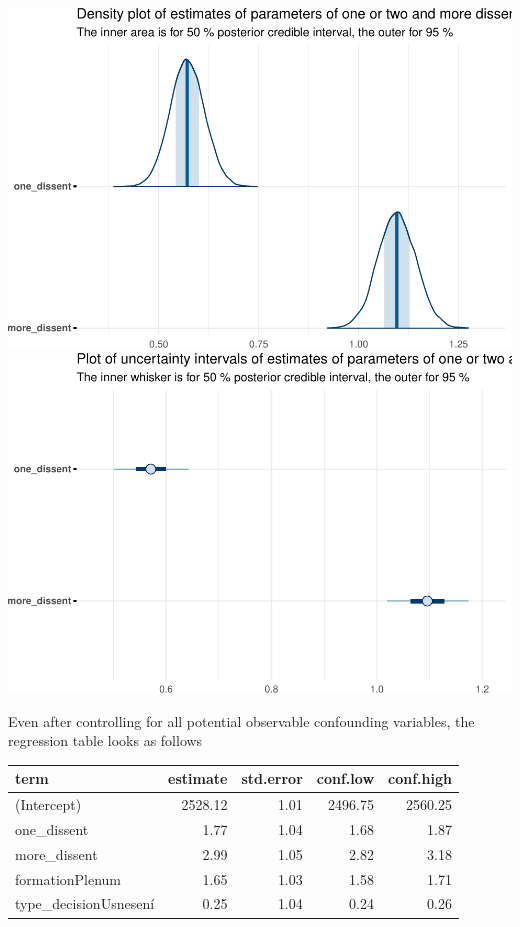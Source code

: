 \documentclass[
  11pt,
]{article}
\begin{document}
\includegraphics{dissents_article_files/figure-latex/length_parameter_plots-1.pdf}
\includegraphics{dissents_article_files/figure-latex/length_parameter_plots-2.pdf}

Even after controlling for all potential observable confounding
variables, the regression table looks as follows

\begin{longtable}[]{@{}lrrrr@{}}
\toprule\noalign{}
term & estimate & std.error & conf.low & conf.high \\
\midrule\noalign{}
\endhead
\bottomrule\noalign{}
\endlastfoot
(Intercept) & 2528.12 & 1.01 & 2496.75 & 2560.25 \\
one\_dissent & 1.77 & 1.04 & 1.68 & 1.87 \\
more\_dissent & 2.99 & 1.05 & 2.82 & 3.18 \\
formationPlenum & 1.65 & 1.03 & 1.58 & 1.71 \\
type\_decisionUsnesení & 0.25 & 1.04 & 0.24 & 0.26 \\
\end{longtable}
\end{document}
